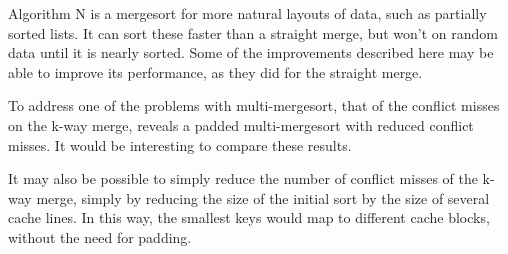 Algorithm N is a mergesort for more natural layouts of data, such as partially
sorted lists. It can sort these faster than a straight merge, but won't on
random data until it is nearly sorted. Some of the improvements described here
may be able to improve its performance, as they did for the straight merge.

To address one of the problems with multi-mergesort, that of the conflict misses
on the k-way merge, \cite{Xiao00} reveals a padded multi-mergesort with reduced 
conflict misses. It would be interesting to compare these results.

It may also be possible to simply reduce the number of conflict misses of the
k-way merge, simply by reducing the size of the initial sort by the size of
several cache lines. In this way, the smallest keys would map to different
cache blocks, without the need for padding.
